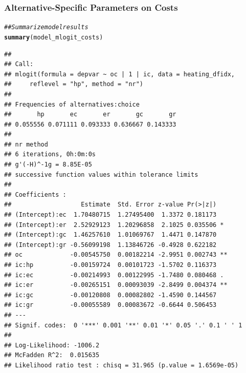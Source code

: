 \documentclass{beamer}\usepackage[]{graphicx}\usepackage[]{xcolor}
\makeatletter
\newcommand{\hlcom}[1]{\textcolor[rgb]{0.678,0.584,0.686}{\textit{#1}}}%
\newcommand{\hlstd}[1]{\textcolor[rgb]{0.345,0.345,0.345}{#1}}%
\newcommand{\hlkwd}[1]{\textcolor[rgb]{0.737,0.353,0.396}{\textbf{#1}}}%
\newenvironment{kframe}{%
 \def\at@end@of@kframe{}%
 \ifinner\ifhmode%
  \def\at@end@of@kframe{\end{minipage}}%
  \begin{minipage}{\columnwidth}%
 \fi\fi%
 \def\FrameCommand##1{\hskip\@totalleftmargin \hskip-\fboxsep
 \colorbox{shadecolor}{##1}\hskip-\fboxsep
     \hskip-\linewidth \hskip-\@totalleftmargin \hskip\columnwidth}%
 \MakeFramed {\advance\hsize-\width
   \@totalleftmargin\z@ \linewidth\hsize
   \@setminipage}}%
 {\par\unskip\endMakeFramed%
 \at@end@of@kframe}
\newenvironment{knitrout}{}{} %
\makeatother
\begin{document}
\begin{frame}[fragile]\frametitle{Alternative-Specific Parameters on Costs}
    \vspace{1ex}
\begin{knitrout}\tiny
{}\color{fgcolor}\begin{kframe}
\begin{alltt}
\hlcom{## Summarize model results}
\hlkwd{summary}\hlstd{(model_mlogit_costs)}
\end{alltt}
\begin{verbatim}
## 
## Call:
## mlogit(formula = depvar ~ oc | 1 | ic, data = heating_dfidx, 
##     reflevel = "hp", method = "nr")
## 
## Frequencies of alternatives:choice
##       hp       ec       er       gc       gr 
## 0.055556 0.071111 0.093333 0.636667 0.143333 
## 
## nr method
## 6 iterations, 0h:0m:0s 
## g'(-H)^-1g = 8.85E-05 
## successive function values within tolerance limits 
## 
## Coefficients :
##                   Estimate  Std. Error z-value Pr(>|z|)   
## (Intercept):ec  1.70480715  1.27495400  1.3372 0.181173   
## (Intercept):er  2.52929123  1.20296858  2.1025 0.035506 * 
## (Intercept):gc  1.46257610  1.01069767  1.4471 0.147870   
## (Intercept):gr -0.56099198  1.13846726 -0.4928 0.622182   
## oc             -0.00545750  0.00182214 -2.9951 0.002743 **
## ic:hp          -0.00159724  0.00101723 -1.5702 0.116373   
## ic:ec          -0.00214993  0.00122995 -1.7480 0.080468 . 
## ic:er          -0.00265151  0.00093039 -2.8499 0.004374 **
## ic:gc          -0.00120808  0.00082802 -1.4590 0.144567   
## ic:gr          -0.00055589  0.00083672 -0.6644 0.506453   
## ---
## Signif. codes:  0 '***' 0.001 '**' 0.01 '*' 0.05 '.' 0.1 ' ' 1
## 
## Log-Likelihood: -1006.2
## McFadden R^2:  0.015635 
## Likelihood ratio test : chisq = 31.965 (p.value = 1.6569e-05)
\end{verbatim}
\end{kframe}
\end{knitrout}
\end{frame}
\end{document}
